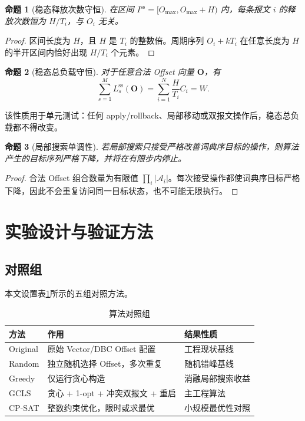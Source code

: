 \documentclass[UTF8,12pt,a4paper]{ctexart}
\newtheorem{proposition}{命题}
\newcommand{\Oset}{\mathcal{A}}
\begin{document}
\begin{proposition}[稳态释放次数守恒]
在区间 $I^{\mathrm{ss}}=[O_{\max},O_{\max}+H)$ 内，每条报文 $i$ 的释放次数恒为 $H/T_i$，与 $O_i$ 无关。
\end{proposition}

\begin{proof}
区间长度为 $H$，且 $H$ 是 $T_i$ 的整数倍。周期序列 $O_i+kT_i$ 在任意长度为 $H$ 的半开区间内恰好出现 $H/T_i$ 个元素。
\end{proof}

\begin{proposition}[稳态总负载守恒]
对于任意合法 Offset 向量 $\symbf{O}$，有
\begin{equation}
 \sum_{s=1}^{M}L^{\mathrm{ss}}_s(\symbf{O})
 =\sum_{i=1}^{N}\frac{H}{T_i}C_i=W.
\end{equation}
\end{proposition}

该性质用于单元测试：任何 apply/rollback、局部移动或双报文操作后，稳态总负载都不得改变。

\begin{proposition}[局部搜索单调性]
若局部搜索只接受严格改善词典序目标的操作，则算法产生的目标序列严格下降，并将在有限步内停止。
\end{proposition}

\begin{proof}
合法 Offset 组合数量为有限值 $\prod_i|\Oset_i|$。每次接受操作都使词典序目标严格下降，因此不会重复访问同一目标状态，也不可能无限执行。
\end{proof}

\section{实验设计与验证方法}

\subsection{对照组}

本文设置表\ref{tab:baselines}所示的五组对照方法。

\begin{table}[htbp]
\centering
\caption{算法对照组}
\label{tab:baselines}
\begin{tabularx}{\textwidth}{lXl}
\toprule
方法 & 作用 & 结果性质\\
\midrule
Original & 原始 Vector/DBC Offset 配置 & 工程现状基线\\
Random & 独立随机选择 Offset，多次重复 & 随机错峰基线\\
Greedy & 仅运行贪心构造 & 消融局部搜索收益\\
GCLS & 贪心 + 1-opt + 冲突双报文 + 重启 & 主工程算法\\
CP-SAT & 整数约束优化，限时或求最优 & 小规模最优性对照\\
\bottomrule
\end{tabularx}
\end{table}
\end{document}
